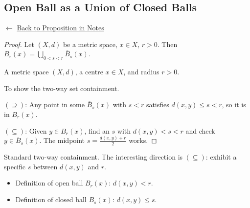 
\subsection*{Open Ball as a Union of Closed Balls}
\label{prf:open-as-union-closed}

\begin{remark*}[Return]
$\leftarrow$ \hyperref[prop:open-as-union-closed]{Back to Proposition in Notes}
\end{remark*}

\begin{proof}
\Claim Let $(X,d)$ be a metric space, $x \in X$, $r > 0$.
Then $B_r(x) = \bigcup_{0 < s < r} \overline{B}_s(x)$.

\Given A metric space $(X,d)$, a centre $x \in X$, and radius $r > 0$.

\Goal To show the two-way set containment.

\Strategy
$(\supseteq)$: Any point in some $\overline{B}_s(x)$ with $s < r$
satisfies $d(x,y) \le s < r$, so it is in $B_r(x)$.

$(\subseteq)$: Given $y \in B_r(x)$, find an $s$ with $d(x,y) < s < r$
and check $y \in \overline{B}_s(x)$.
The midpoint $s = \frac{d(x,y)+r}{2}$ works.


\end{proof}

\begin{remark*}
Standard two-way containment. The interesting direction is $(\subseteq)$:
exhibit a specific $s$ between $d(x,y)$ and $r$.
\end{remark*}

\begin{remark*}[Dependencies]
\begin{itemize}
  \item Definition of open ball $B_r(x)$: $d(x,y) < r$.
  \item Definition of closed ball $\overline{B}_s(x)$: $d(x,y) \le s$.
\end{itemize}
\end{remark*}
